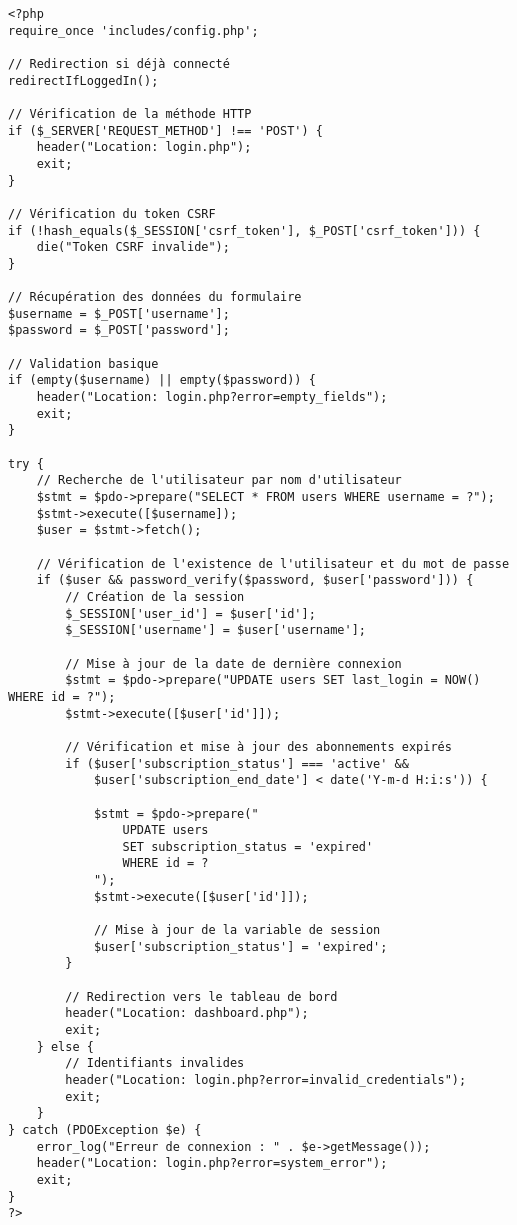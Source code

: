 \documentclass[12pt,a4paper]{report}
\begin{document}
\begin{lstlisting}[style=phpStyle, caption=login\_process.php - Traitement de la connexion]
<?php
require_once 'includes/config.php';

// Redirection si déjà connecté
redirectIfLoggedIn();

// Vérification de la méthode HTTP
if ($_SERVER['REQUEST_METHOD'] !== 'POST') {
    header("Location: login.php");
    exit;
}

// Vérification du token CSRF
if (!hash_equals($_SESSION['csrf_token'], $_POST['csrf_token'])) {
    die("Token CSRF invalide");
}

// Récupération des données du formulaire
$username = $_POST['username'];
$password = $_POST['password'];

// Validation basique
if (empty($username) || empty($password)) {
    header("Location: login.php?error=empty_fields");
    exit;
}

try {
    // Recherche de l'utilisateur par nom d'utilisateur
    $stmt = $pdo->prepare("SELECT * FROM users WHERE username = ?");
    $stmt->execute([$username]);
    $user = $stmt->fetch();
    
    // Vérification de l'existence de l'utilisateur et du mot de passe
    if ($user && password_verify($password, $user['password'])) {
        // Création de la session
        $_SESSION['user_id'] = $user['id'];
        $_SESSION['username'] = $user['username'];
        
        // Mise à jour de la date de dernière connexion
        $stmt = $pdo->prepare("UPDATE users SET last_login = NOW() WHERE id = ?");
        $stmt->execute([$user['id']]);
        
        // Vérification et mise à jour des abonnements expirés
        if ($user['subscription_status'] === 'active' && 
            $user['subscription_end_date'] < date('Y-m-d H:i:s')) {
            
            $stmt = $pdo->prepare("
                UPDATE users 
                SET subscription_status = 'expired'
                WHERE id = ?
            ");
            $stmt->execute([$user['id']]);
            
            // Mise à jour de la variable de session
            $user['subscription_status'] = 'expired';
        }
        
        // Redirection vers le tableau de bord
        header("Location: dashboard.php");
        exit;
    } else {
        // Identifiants invalides
        header("Location: login.php?error=invalid_credentials");
        exit;
    }
} catch (PDOException $e) {
    error_log("Erreur de connexion : " . $e->getMessage());
    header("Location: login.php?error=system_error");
    exit;
}
?>
\end{lstlisting}
\end{document}
